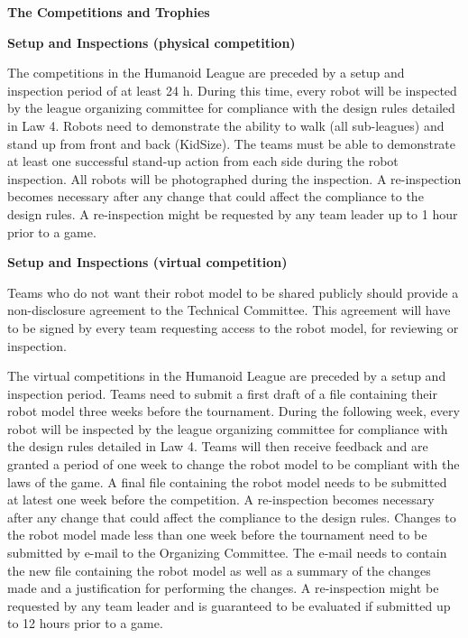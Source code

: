\clearpage
\sffamily
{\bfseries\color[rgb]{0.4,0.4,0.4}The Competitions and Trophies}
{}


\bigskip

{\bfseries Setup and Inspections (physical competition)}

\headlinebox

The competitions in the Humanoid League are preceded by a setup and inspection
period of at least 24 h.
During this time, every robot will be inspected by the league organizing
committee for compliance with the design rules detailed in Law 4.
Robots need to demonstrate the ability to walk (all sub-leagues) and stand up
from front and back (KidSize).
The teams must be able to demonstrate at least one successful stand-up action
from each side during the robot inspection.
All robots will be photographed during the inspection.
A re-inspection becomes necessary after any change that could affect the
compliance to the design rules.
A re-inspection might be requested by any team leader up to 1 hour prior to a game.

\bigskip

{\bfseries Setup and Inspections (virtual competition)}

\headlinebox

Teams who do not want their robot model to be shared publicly should
provide a non-disclosure agreement to the Technical Committee. This agreement
will have to be signed by every team requesting access to the robot model, for
reviewing or inspection.

The virtual competitions in the Humanoid League are preceded by a setup and inspection
period. Teams need to submit a first draft of a file containing their robot model 
three weeks before the tournament.
During the following week, every robot will be inspected by the league organizing
committee for compliance with the design rules detailed in Law 4. Teams will then receive feedback and are granted a period of one week to change the robot model to be compliant with the laws of the game. A final file containing the robot model needs to be submitted at latest one week before the competition.
A re-inspection becomes necessary after any change that could affect the
compliance to the design rules. Changes to the robot model made less than one week before the tournament need to be submitted by e-mail to the Organizing Committee. The e-mail needs to contain the new file containing the robot model as well as a summary of the changes made and a justification for performing the changes.
A re-inspection might be requested by any team leader and is guaranteed to be evaluated if submitted up to 12 hours prior to a game.

